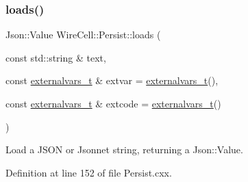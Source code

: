 \subsubsection{\texorpdfstring{loads()}{loads()}}
{\footnotesize\ttfamily Json\+::\+Value Wire\+Cell\+::\+Persist\+::loads (\begin{DoxyParamCaption}\item[{const std\+::string \&}]{text,  }\item[{const \hyperlink{namespace_wire_cell_1_1_persist_ae031fc57de5b5814ccd700d007bc847b}{externalvars\+\_\+t} \&}]{extvar = {\ttfamily \hyperlink{namespace_wire_cell_1_1_persist_ae031fc57de5b5814ccd700d007bc847b}{externalvars\+\_\+t}()},  }\item[{const \hyperlink{namespace_wire_cell_1_1_persist_ae031fc57de5b5814ccd700d007bc847b}{externalvars\+\_\+t} \&}]{extcode = {\ttfamily \hyperlink{namespace_wire_cell_1_1_persist_ae031fc57de5b5814ccd700d007bc847b}{externalvars\+\_\+t}()} }\end{DoxyParamCaption})}

Load a J\+S\+ON or Jsonnet string, returning a Json\+::\+Value. 

Definition at line 152 of file Persist.\+cxx.

